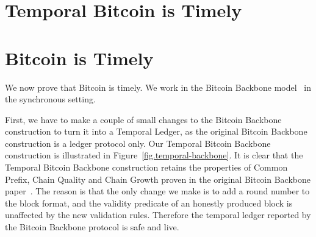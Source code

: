 \section{Temporal Bitcoin is Timely}

\section{Bitcoin is Timely}

We now prove that Bitcoin is timely. We work in the Bitcoin Backbone model~\cite{backbone}
in the synchronous setting.

First, we have to make a couple of small changes to the Bitcoin Backbone construction to turn it
into a Temporal Ledger, as the original Bitcoin Backbone construction is a ledger protocol only.
Our Temporal Bitcoin Backbone construction is illustrated in Figure~\ref{fig.temporal-backbone}.
It is clear that the Temporal Bitcoin Backbone construction retains the properties of Common Prefix,
Chain Quality and Chain Growth proven in the original Bitcoin Backbone paper~\cite{backbone}.
The reason is that the only change we make is to add a round number to the block format, and
the validity predicate of an honestly produced block is unaffected by the new validation rules.
Therefore the temporal ledger reported by the Bitcoin Backbone protocol is safe and live.

